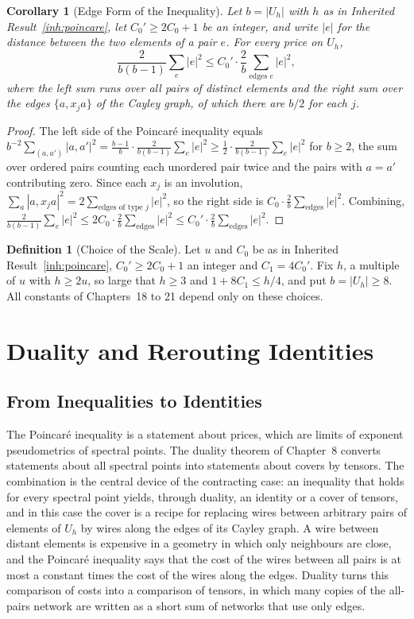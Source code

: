 \documentclass[11pt,letterpaper]{report}
\theoremstyle{plain}
\newtheorem{corollary}[theorem]{Corollary}
\theoremstyle{definition}
\newtheorem{definition}[theorem]{Definition}
\theoremstyle{remark}
\begin{document}
\begin{corollary}[Edge Form of the Inequality]\label{co:edgeform}
Let $b=|U_h|$ with $h$ as in Inherited Result~\ref{inh:poincare}, let $C_0'\ge2C_0+1$ be an integer, and write $|e|$ for the distance between the two elements of a pair $e$. For every price on $U_h$,
\[
\frac2{b(b-1)}\sum_{e}|e|^2\le C_0'\cdot\frac2b\sum_{\text{edges }e}|e|^2,
\]
where the left sum runs over all pairs of distinct elements and the right sum over the edges $\{a,x_ja\}$ of the Cayley graph, of which there are $b/2$ for each $j$.
\end{corollary}
\begin{proof}
The left side of the Poincar\'e inequality equals $b^{-2}\sum_{(a,a')}|a,a'|^2=\tfrac{b-1}{b}\cdot\tfrac2{b(b-1)}\sum_e|e|^2\ge\tfrac12\cdot\tfrac2{b(b-1)}\sum_e|e|^2$ for $b\ge2$, the sum over ordered pairs counting each unordered pair twice and the pairs with $a=a'$ contributing zero. Since each $x_j$ is an involution, $\sum_a|a,x_ja|^2=2\sum_{\text{edges of type }j}|e|^2$, so the right side is $C_0\cdot\tfrac2b\sum_{\text{edges}}|e|^2$. Combining, $\tfrac2{b(b-1)}\sum_e|e|^2\le2C_0\cdot\tfrac2b\sum_{\text{edges}}|e|^2\le C_0'\cdot\tfrac2b\sum_{\text{edges}}|e|^2$.
\end{proof}

\begin{definition}[Choice of the Scale]
Let $u$ and $C_0$ be as in Inherited Result~\ref{inh:poincare}, $C_0'\ge2C_0+1$ an integer and $C_1=4C_0'$. Fix $h$, a multiple of $u$ with $h\ge2u$, so large that $h\ge3$ and $1+8C_1\le h/4$, and put $b=|U_h|\ge8$. All constants of Chapters~18 to 21 depend only on these choices.
\end{definition}

\chapter{Duality and Rerouting Identities}

\section{From Inequalities to Identities}

The Poincar\'e inequality is a statement about prices, which are limits of exponent pseudometrics of spectral points. The duality theorem of Chapter~8 converts statements about all spectral points into statements about covers by tensors. The combination is the central device of the contracting case: an inequality that holds for every spectral point yields, through duality, an identity or a cover of tensors, and in this case the cover is a recipe for replacing wires between arbitrary pairs of elements of $U_h$ by wires along the edges of its Cayley graph. A wire between distant elements is expensive in a geometry in which only neighbours are close, and the Poincar\'e inequality says that the cost of the wires between all pairs is at most a constant times the cost of the wires along the edges. Duality turns this comparison of costs into a comparison of tensors, in which many copies of the all-pairs network are written as a short sum of networks that use only edges.
\end{document}
